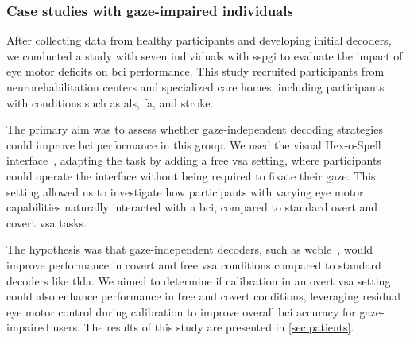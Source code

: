 \subsubsection{Case studies with gaze-impaired individuals}
\label{sec:patients/approach/casestudies}

After collecting data from healthy participants and developing initial decoders, we conducted
a study with seven individuals with \ac{sspgi} to evaluate the impact of eye motor deficits
on \ac{bci} performance.
This study recruited participants from neurorehabilitation centers
and specialized care homes, including participants with conditions such as \ac{als}, \ac{fa},
and stroke.

The primary aim was to assess whether gaze-independent decoding strategies could improve
\ac{bci} performance in this group.
We used the visual Hex-o-Spell interface~\cite{Treder2010}, adapting the task by adding a
free \ac{vsa} setting, where participants could operate the interface without being required
to fixate their gaze.
This setting allowed us to investigate how participants with varying eye motor capabilities
naturally interacted with a \ac{bci}, compared to standard overt and covert \ac{vsa} tasks.

The hypothesis was that gaze-independent decoders, such as \ac{wcble}~\cite{VanDenKerchove2024},
would improve performance in covert and free \ac{vsa} conditions compared to standard
decoders like \ac{tlda}.
We aimed to determine if calibration in an overt \ac{vsa} setting could also enhance
performance in free and covert conditions, leveraging residual eye motor control during
calibration to improve overall \ac{bci} accuracy for gaze-impaired users.
The results of this study are presented in \cref{sec:patients}.
